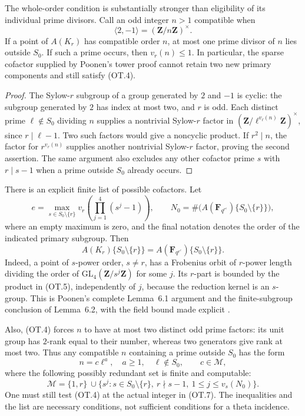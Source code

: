 \documentclass[11pt,a4paper]{article}
\begin{document}
The whole-order condition is substantially stronger than
eligibility of its individual prime divisors.  Call an odd
integer $n>1$ compatible when
\[
                   \langle2,-1\rangle
                      =(\mathbf Z/n\mathbf Z)^\times.
 \tag{OT.4}
\]
If a point of $A(K_r)$ has compatible order $n$, at most one
prime divisor of $n$ lies outside $S_0$.  If such a prime occurs,
then $v_r(n)\le1$.  In particular, the sparse cofactor supplied by
Poonen's tower proof cannot retain two new primary components
and still satisfy (OT.4).

\begin{proof}
The Sylow-$r$ subgroup of a group generated by $2$ and $-1$ is
cyclic: the subgroup generated by $2$ has index at most two,
and $r$ is odd.  Each distinct prime $\ell\notin S_0$ dividing
$n$ supplies a nontrivial Sylow-$r$ factor in
$(\mathbf Z/\ell^{v_\ell(n)}\mathbf Z)^\times$, since
$r\mid\ell-1$.  Two such factors would give a noncyclic product.
If $r^2\mid n$, the factor for $r^{v_r(n)}$ supplies another
nontrivial Sylow-$r$ factor, proving the second assertion.
The same argument also excludes any other cofactor prime $s$
with $r\mid s-1$ when a prime outside $S_0$ already occurs.
\end{proof}

There is an explicit finite list of possible cofactors.  Let
\[
 e=\max_{s\in S_0\setminus\{r\}}
       v_r\!\left(\prod_{j=1}^4(s^j-1)\right),
 \qquad
 N_0=\#\bigl(A(\mathbf F_{q^{r^e}})\{S_0\setminus\{r\}\}\bigr),
 \tag{OT.5}
\]
where an empty maximum is zero, and the final notation denotes
the order of the indicated primary subgroup.  Then
\[
 A(K_r)\{S_0\setminus\{r\}\}
  =A(\mathbf F_{q^{r^e}})\{S_0\setminus\{r\}\}.
 \tag{OT.6}
\]
Indeed, a point of $s$-power order, $s\ne r$, has a Frobenius
orbit of $r$-power length dividing the order of
$\mathrm{GL}_4(\mathbf Z/s^j\mathbf Z)$ for some $j$.
Its $r$-part is bounded by the product in (OT.5), independently
of $j$, because the reduction kernel is an $s$-group.  This is
Poonen's complete Lemma~6.1 argument and the finite-subgroup
conclusion of Lemma~6.2, with the field bound made explicit
\cite[Lemmas~6.1--6.2]{Poonen2005}.

Also, (OT.4) forces $n$ to have at most two distinct odd prime
factors: its unit group has $2$-rank equal to their number,
whereas two generators give rank at most two.  Thus any compatible
$n$ containing a prime outside $S_0$ has the form
\[
 n=c\ell^a,\quad a\ge1,\quad \ell\notin S_0,\qquad
 c\in\mathcal M,
 \tag{OT.7}
\]
where the following possibly redundant set is finite and
computable:
\[
 \mathcal M=\{1,r\}\ \cup
 \{s^j:s\in S_0\setminus\{r\},\ r\nmid s-1,
                         \ 1\le j\le v_s(N_0)\}.
 \tag{OT.8}
\]
One must still test (OT.4) at the actual integer in (OT.7).
The inequalities and the list are necessary conditions, not
sufficient conditions for a theta incidence.
\end{document}
